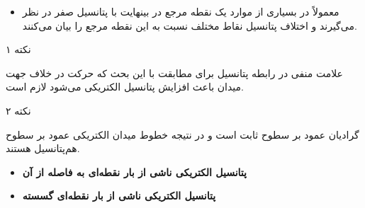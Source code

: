 \begin{ELunit}

\begin{itemize}
\tightlist
\item
  معمولاً در بسیاری از موارد یک نقطه مرجع در بینهایت با پتانسیل صفر در نظر می‌گیرند و اختلاف پتانسیل نقاط مختلف نسبت به این نقطه مرجع را بیان می‌کنند.
\end{itemize}

\end{ELunit}

\begin{ELimportant}{}


\end{ELimportant}

\begin{ELremark}{نکته ۱}

علامت منفی در رابطه پتانسیل برای مطابقت با این بحث که حرکت در خلاف جهت میدان باعث افزایش پتانسیل الکتریکی می‌شود لازم است.

\end{ELremark}

\begin{ELremark}{نکته ۲}

گرادیان  عمود بر سطوح  ثابت است و در نتیجه خطوط میدان الکتریکی عمود بر سطوح هم‌پتانسیل هستند.

\end{ELremark}

\begin{ELunit}

\begin{itemize}
\tightlist
\item
  \textbf{پتانسیل الکتریکی ناشی از بار نقطه‌ای  به فاصله  از آن}
\end{itemize}



\begin{itemize}
\tightlist
\item
  \textbf{پتانسیل الکتریکی ناشی از  بار نقطه‌ای گسسته}
\end{itemize}


\end{ELunit}

